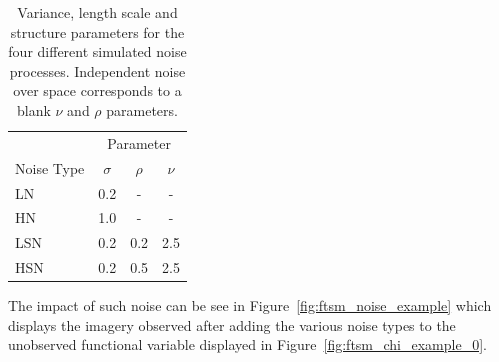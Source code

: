 \begin{table}[htbp!] 
	\caption[Parameters for noise process in simulations for FTSM]{Variance, length scale and structure parameters for the four different simulated noise processes. Independent noise over space corresponds to a blank $\nu$ and $\rho$ parameters. }
	\centering
	\label{tab:ftsm_sim_noise_params}
	\begin{tabular}{l c c  c}
		\toprule
		& \multicolumn{3}{c}{Parameter} \\ 
		Noise Type & $\sigma$ & $\rho$& $\nu$ \\
		\midrule
		LN & 0.2 & - & - \\
		HN & 1.0 & - & -\\
		LSN & 0.2 & 0.2 & 2.5 \\
		HSN & 0.2 & 0.5 & 2.5 \\
		\bottomrule
	\end{tabular}
\end{table}

The impact of such noise can be see in Figure~\ref{fig:ftsm_noise_example} which displays the imagery observed after adding the various noise types to the unobserved functional variable displayed in Figure~\ref{fig:ftsm_chi_example_0}. 

